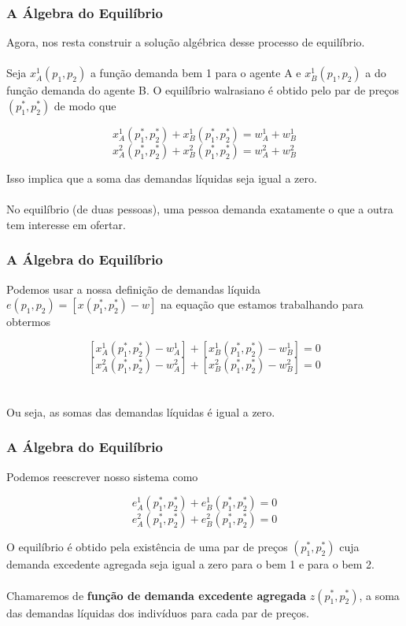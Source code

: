 \documentclass{beamer}[10]
\begin{document}
\begin{frame}
	\frametitle{A Álgebra do Equilíbrio}

	
	Agora, nos resta construir a solução algébrica desse processo de equilíbrio.
	\\~\\
	Seja $x_A^1(p_1,p_2)$ a função demanda  bem 1 para o agente A e $x_B^1(p_1,p_2)$ a do função demanda do agente B. O equilíbrio walrasiano é obtido pelo par de preços $(p_1^*,p_2^*)$ de modo que

	$$ x_A^1(p_1^*,p_2^*) + x_B^1(p_1^*,p_2^*) = w_A^1 + w_B^1 $$
	$$ x_A^2(p_1^*,p_2^*) + x_B^2(p_1^*,p_2^*) = w_A^2 + w_B^2 $$

	Isso implica que a soma das demandas líquidas seja igual a zero. 
	\\~\\
	No equilíbrio (de duas pessoas), uma pessoa demanda exatamente o que a outra tem interesse em ofertar.

\end{frame}

\begin{frame}
	\frametitle{A Álgebra do Equilíbrio}


	Podemos usar a nossa definição de demandas líquida $e(p_1,p_2) = [x(p_1^*,p_2^*) - w]$ na equação que estamos trabalhando para obtermos

	$$ [x_A^1(p_1^*,p_2^*) - w_A^1] + [x_B^1(p_1^*,p_2^*) - w_B^1] = 0 $$
	$$ [x_A^2(p_1^*,p_2^*) - w_A^2] + [x_B^2(p_1^*,p_2^*) - w_B^2] = 0 $$
	\\~\\
	Ou seja, as somas das demandas líquidas é igual a zero.

\end{frame}

\begin{frame}
	\frametitle{A Álgebra do Equilíbrio}

	Podemos reescrever nosso sistema como

	$$ e_A^1(p_1^*,p_2^*) + e_B^1(p_1^*,p_2^*) = 0 $$
	$$ e_A^2(p_1^*,p_2^*) + e_B^2(p_1^*,p_2^*) = 0 $$
	
	O equilíbrio é obtido pela existência de uma par de preços $(p_1^*,p_2^*)$ cuja demanda excedente agregada seja igual a zero para o bem 1 e para o bem 2.
	\\~\\
	Chamaremos de \textbf{função de demanda excedente agregada} $z(p_1^*,p_2^*)$, a soma das demandas líquidas dos indivíduos para cada par de preços.

\end{frame}
\end{document}
